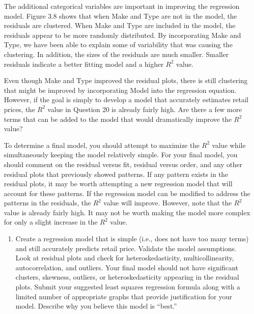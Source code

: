 \documentclass[
]{report}
\providecommand{\tightlist}{%
  \setlength{\itemsep}{0pt}\setlength{\parskip}{0pt}}
\begin{document}
The additional categorical variables are important in improving the regression model. Figure 3.8 shows that when Make and Type are not in the model, the residuals are clustered. When Make and Type are included in the model, the residuals appear to be more randomly distributed. By incorporating Make and Type, we have been able to explain some of variability that was causing the clustering. In addition, the sizes of the residuals are much smaller. Smaller residuals indicate a better fitting model and a higher \(R^2\) value.

Even though Make and Type improved the residual plots, there is still clustering that might be improved by incorporating Model into the regression equation. However, if the goal is simply to develop a model that accurately estimates retail prices, the \(R^2\) value in Question 20 is already fairly high. Are there a few more terms that can be added to the model that would dramatically improve the \(R^2\) value?

To determine a final model, you should attempt to maximize the \(R^2\) value while simultaneously keeping the model relatively simple. For your final model, you should comment on the residual versus fit, residual versus order, and any other residual plots that previously showed patterns. If any pattern exists in the residual plots, it may be worth attempting a new regression model that will account for these patterns. If the regression model can be modified to address the patterns in the residuals, the \(R^2\) value will improve. However, note that the \(R^2\) value is already fairly high. It may not be worth making the model more complex for only a slight increase in the \(R^2\) value.

\begin{enumerate}
\def\labelenumi{\arabic{enumi}.}
\setcounter{enumi}{20}
\tightlist
\item
  Create a regression model that is simple (i.e., does not have too many terms) and still accurately predicts retail price. Validate the model assumptions. Look at residual plots and check for heteroskedasticity, multicollinearity, autocorrelation, and outliers. Your final model should not have significant clusters, skewness, outliers, or heteroskedasticity appearing in the residual plots. Submit your suggested least squares regression formula along with a limited number of appropriate graphs that provide justification for your model. Describe why you believe this model is ``best.''
\end{enumerate}
\end{document}
